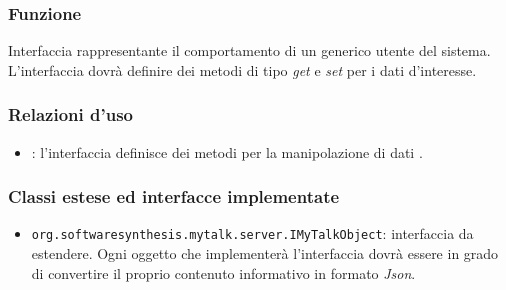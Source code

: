 
\subsubsection*{Funzione}
Interfaccia rappresentante il comportamento di un generico utente del sistema. L'interfaccia dovrà definire dei metodi di tipo \textit{get} e \textit{set} per i dati d'interesse.

\subsubsection*{Relazioni d'uso}

\begin{itemize}
	\item {}: l'interfaccia definisce dei metodi per la manipolazione di dati .
\end{itemize}

\subsubsection*{Classi estese ed interfacce implementate}
\begin{itemize}
	\item \texttt{org.softwaresynthesis.mytalk.server.IMyTalkObject}: interfaccia da estendere. Ogni oggetto che implementerà l'interfaccia  dovrà essere in grado di convertire il proprio contenuto informativo in formato \textit{Json}.
\end{itemize}


